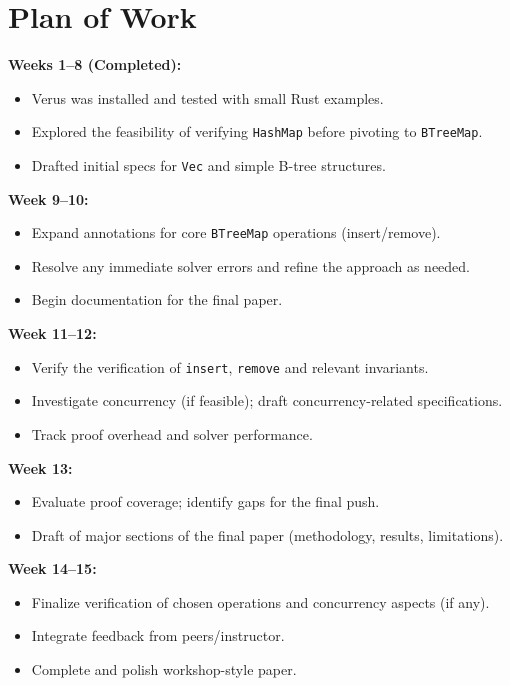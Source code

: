 \documentclass[conference]{IEEEtran}
\begin{document}
\section{Plan of Work}
\noindent\textbf{Weeks 1--8 (Completed):}
\begin{itemize}
\item Verus was installed and tested with small Rust examples.
\item Explored the feasibility of verifying \texttt{HashMap} before pivoting to \texttt{BTreeMap}.
\item Drafted initial specs for \texttt{Vec} and simple B-tree structures.
\end{itemize}

\noindent\textbf{Week 9--10:}
\begin{itemize}
\item Expand annotations for core \texttt{BTreeMap} operations (insert/remove).
\item Resolve any immediate solver errors and refine the approach as needed.
\item Begin documentation for the final paper.
\end{itemize}

\noindent\textbf{Week 11--12:}
\begin{itemize}
\item Verify the verification of \texttt{insert}, \texttt{remove} and relevant invariants.
\item Investigate concurrency (if feasible); draft concurrency-related specifications.
\item Track proof overhead and solver performance.
\end{itemize}

\noindent\textbf{Week 13:}
\begin{itemize}
\item Evaluate proof coverage; identify gaps for the final push.
\item Draft of major sections of the final paper (methodology, results, limitations).
\end{itemize}

\noindent\textbf{Week 14--15:}
\begin{itemize}
\item Finalize verification of chosen operations and concurrency aspects (if any).
\item Integrate feedback from peers/instructor.
\item Complete and polish workshop-style paper.
\end{itemize}
\end{document}
